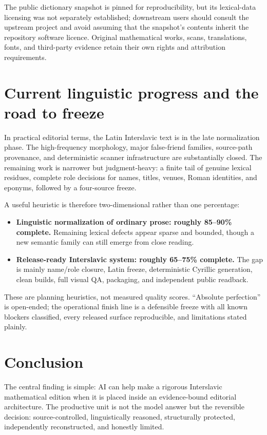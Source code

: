 \documentclass[11pt,a4paper]{article}
\begin{document}
The public dictionary snapshot is pinned for reproducibility, but its lexical-data licensing was not separately established; downstream users should consult the upstream project and avoid assuming that the snapshot's contents inherit the repository software licence. Original mathematical works, scans, translations, fonts, and third-party evidence retain their own rights and attribution requirements.

\section{Current linguistic progress and the road to freeze}

In practical editorial terms, the Latin Interslavic text is in the late normalization phase. The high-frequency morphology, major false-friend families, source-path provenance, and deterministic scanner infrastructure are substantially closed. The remaining work is narrower but judgment-heavy: a finite tail of genuine lexical residues, complete role decisions for names, titles, venues, Roman identities, and eponyms, followed by a four-source freeze.

A useful heuristic is therefore two-dimensional rather than one percentage:

\begin{itemize}
  \item \textbf{Linguistic normalization of ordinary prose: roughly 85--90\% complete.} Remaining lexical defects appear sparse and bounded, though a new semantic family can still emerge from close reading.
  \item \textbf{Release-ready Interslavic system: roughly 65--75\% complete.} The gap is mainly name/role closure, Latin freeze, deterministic Cyrillic generation, clean builds, full visual QA, packaging, and independent public readback.
\end{itemize}

These are planning heuristics, not measured quality scores. ``Absolute perfection'' is open-ended; the operational finish line is a defensible freeze with all known blockers classified, every released surface reproducible, and limitations stated plainly.

\section{Conclusion}

The central finding is simple: AI can help make a rigorous Interslavic mathematical edition when it is placed inside an evidence-bound editorial architecture. The productive unit is not the model answer but the reversible decision: source-controlled, linguistically reasoned, structurally protected, independently reconstructed, and honestly limited.
\end{document}
